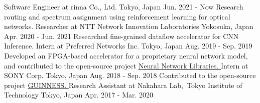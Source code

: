 
\begin{cventries}
  \eduentry
    {} %
    {Software Engineer at rinna Co., Ltd.} %
    {Tokyo, Japan} %
    {Jun. 2021 - Now} %
  \eduentry
    {Research routing and spectrum assignment using reinforcement learning for optical networks. } %
    {Researcher at NTT Network Innovation Laboratories} %
    {Yokosuka, Japan} %
    {Apr. 2020 - Jun. 2021} %
  \eduentry
    {Researched fine-grained dataflow accelerator for CNN Inference. } %
    {Intern at Preferred Networks Inc.} %
    {Tokyo, Japan} %
    {Aug. 2019 - Sep. 2019} %
  \eduentry
    {Developed an FPGA-based accelerator for a proprietary neural network model, and contributed to the open-source project \href{https://github.com/sony/nnabla}{Neural Network Libraries. }} %
    {Intern at SONY Corp.} %
    {Tokyo, Japan} %
    {Aug. 2018 - Sep. 2018} %
  \eduentry
    {Contributed to the open-source project \href{https://github.com/HirokiNakahara/GUINNESS}{GUINNESS. }} %
    {Research Assistant at Nakahara Lab,\ Tokyo Institute of Technology} 
    {Tokyo, Japan} %
    {Apr. 2017 - Mar. 2020} %
\end{cventries}
